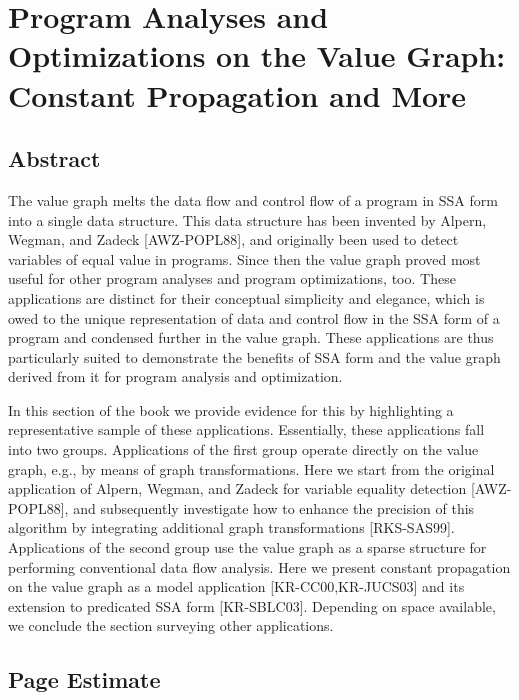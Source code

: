 
\chapter*{Program Analyses and Optimizations on the Value Graph: Constant Propagation and More}


\section{Abstract}

The value graph melts the data flow and control flow of a program in
SSA form into a single data structure. This data structure has been
invented by Alpern, Wegman, and Zadeck [AWZ-POPL88], and originally
been used to detect variables of equal value in programs. Since then
the value graph proved most useful for other program analyses and
program optimizations, too. These applications are distinct for their
conceptual simplicity and elegance, which is owed to the unique
representation of data and control flow in the SSA form of a program
and condensed further in the value graph. These applications are thus
particularly suited to demonstrate the benefits of SSA form and the
value graph derived from it for program analysis and optimization.

In this section of the book we provide evidence for this by
highlighting a representative sample of these
applications. Essentially, these applications fall into two
groups. Applications of the first group operate directly on the value
graph, e.g., by means of graph transformations. Here we start from the
original application of Alpern, Wegman, and Zadeck for variable
equality detection [AWZ-POPL88], and subsequently investigate how to
enhance the precision of this algorithm by integrating additional
graph transformations [RKS-SAS99]. Applications of the second group
use the value graph as a sparse structure for performing conventional
data flow analysis. Here we present constant propagation on the value
graph as a model application [KR-CC00,KR-JUCS03] and its extension to
predicated SSA form [KR-SBLC03]. Depending on space available, we
conclude the section surveying other applications.



\section{Page Estimate}

